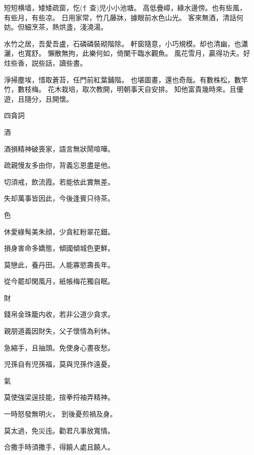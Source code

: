 短短横墙，矮矮疏窗，忔(忄查)児小小池塘。
高低疊嶂，綠水邊傍。也有些風，有些月，有些凉。
日用家常，竹几藤牀，據眼前水色山光。
客來無酒，清話何妨。但細烹茶，熱烘盞，淺澆湯。

水竹之居，吾愛吾盧，石磷磷裝砌階除。
軒窗隨意，小巧規模。却也清幽，也瀟灑，也寬舒。
懶散無拘，此樂何如，倚闌干臨水觀魚。
風花雪月，贏得功夫。好炷些香，説些話，讀些書。

淨掃塵埃，惜取蒼苔，任門前紅葉鋪階。
也堪圖畫，還也奇哉。有數株松，數竿竹，數枝梅。
花木栽培，取次教開，明朝事天自安排。
知他富貴幾時來。且優遊，且隨分，且開懷。



四貪詞

酒

酒損精神破喪家，語言無狀鬧喧嘩。

疏親慢友多由你，背義忘恩盡是他。

切須戒，飲流霞。若能依此實無差。

失却萬事皆因此，今後逢賓只待茶。

色

休愛綠髩美朱顔，少貪紅粉翠花鈿。

損身害命多嬌態，傾國傾城色更鮮。

莫戀此，養丹田。人能寡慾壽長年。

從今罷却閑風月，紙帳梅花獨自眠。

財

錢帛金珠籠内收，若非公道少貪求。

親朋道義因財失，父子懷情為利休。

急縮手，且抽頭。免使身心晝夜愁。

児孫自有児孫福，莫與児孫作遠憂。

氣

莫使強梁逞技能，揎拳捋袖弄精神。

一時怒發無明火，
到後憂煎禍及身。

莫太過，免災迍。勸君凡事放寬情。

合撒手時須撒手，得饒人處且饒人。
